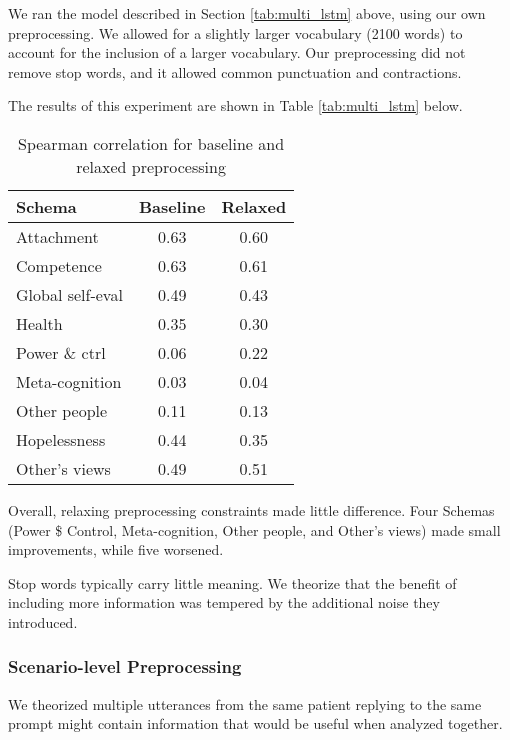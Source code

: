 \documentclass[11pt,a4paper]{article}
\begin{document}
We ran the model described in Section \ref{tab:multi_lstm} above, using our own preprocessing. We allowed for a slightly larger vocabulary (2100 words) to account for the inclusion of a larger vocabulary. Our preprocessing did not remove stop words, and it allowed common punctuation and contractions. 

The results of this experiment are shown in Table \ref{tab:multi_lstm} below.

\begin{table}[H]
\centering
\begin{tabular}{lcc}
\toprule
Schema                  &Baseline          &Relaxed \\ %
\midrule
Attachment              & 0.63 & 0.60\\
Competence              & 0.63 & 0.61\\
Global self-eval        & 0.49 & 0.43\\
Health                  & 0.35 & 0.30\\
Power \& ctrl           & 0.06 & 0.22\\
Meta-cognition          & 0.03 & 0.04\\
Other people            & 0.11 & 0.13\\
Hopelessness            & 0.44 & 0.35\\
Other's views           & 0.49 & 0.51\\
\bottomrule
\end{tabular}
\caption{Spearman correlation for baseline and relaxed preprocessing}
\label{tab:relaxed_preprocessing}
\end{table}

Overall, relaxing preprocessing constraints made little difference. Four Schemas (Power \$ Control, Meta-cognition, Other people, and Other's views) made small improvements, while five worsened. 

Stop words typically carry little meaning. We theorize that the benefit of including more information was tempered by the additional noise they introduced.

\subsubsection{Scenario-level Preprocessing}
We theorized multiple utterances from the same patient replying to the same prompt might contain information that would be useful when analyzed together.  
\end{document}
